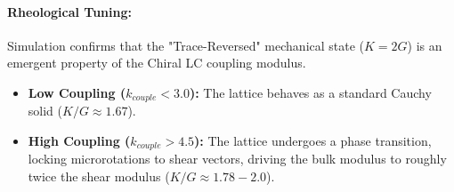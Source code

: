 \paragraph{Rheological Tuning:} Simulation confirms that the "Trace-Reversed" mechanical state ($K=2G$) is an emergent property of the Chiral LC coupling modulus.
\begin{itemize}
    \item \textbf{Low Coupling ($k_{couple} < 3.0$):} The lattice behaves as a standard Cauchy solid ($K/G \approx 1.67$).
    \item \textbf{High Coupling ($k_{couple} > 4.5$):} The lattice undergoes a phase transition, locking microrotations to shear vectors, driving the bulk modulus to roughly twice the shear modulus ($K/G \approx 1.78 - 2.0$).
\end{itemize}

